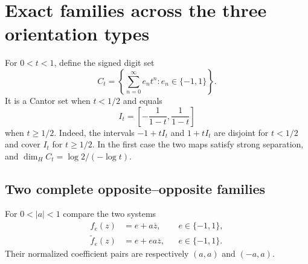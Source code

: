 \section{Exact families across the three orientation types}
\label{sec:restored-exact-families}

For $0<t<1$, define the signed digit set
\begin{equation}\label{eq:restored-Ct}
 C_t=\left\{\sum_{n=0}^{\infty}e_nt^n:
               e_n\in\{-1,1\}\right\}.
\end{equation}
It is a Cantor set when $t<1/2$ and equals
\[
 I_t=\left[-\frac1{1-t},\frac1{1-t}\right]
\]
when $t\ge1/2$. Indeed, the intervals $-1+tI_t$ and $1+tI_t$
are disjoint for $t<1/2$ and cover $I_t$ for $t\ge1/2$.
In the first case the two maps satisfy strong separation, and
$\dim_H C_t=\log2/(-\log t)$.

\subsection{Two complete opposite--opposite families}

For $0<|a|<1$ compare the two systems
\begin{align}
 f_e(z)&=e+a\overline z,
             &&e\in\{-1,1\},\label{eq:restored-OO-diagonal}\\
 \widetilde f_e(z)&=e+ea\overline z,
             &&e\in\{-1,1\}.\label{eq:restored-OO-antidiagonal}
\end{align}
Their normalized coefficient pairs are respectively $(a,a)$ and
$(-a,a)$.

